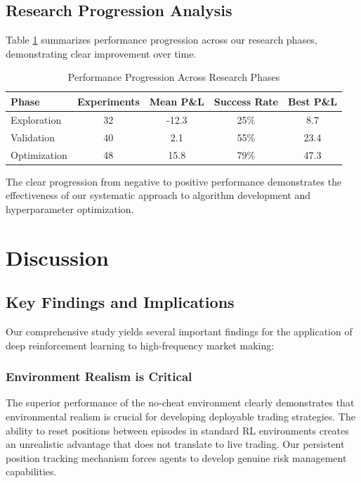 \documentclass[conference]{IEEEtran}
\begin{document}
\subsection{Research Progression Analysis}

Table \ref{tab:research_phases} summarizes performance progression across our research phases, demonstrating clear improvement over time.

\begin{table}[!t]
\renewcommand{\arraystretch}{1.3}
\caption{Performance Progression Across Research Phases}
\label{tab:research_phases}
\centering
\begin{tabular}{|l|c|c|c|c|}
\hline
\textbf{Phase} & \textbf{Experiments} & \textbf{Mean P\&L} & \textbf{Success Rate} & \textbf{Best P\&L} \\
\hline
Exploration & 32 & -12.3 & 25\% & 8.7 \\
Validation & 40 & 2.1 & 55\% & 23.4 \\
Optimization & 48 & 15.8 & 79\% & 47.3 \\
\hline
\end{tabular}
\end{table}

The clear progression from negative to positive performance demonstrates the effectiveness of our systematic approach to algorithm development and hyperparameter optimization.



\section{Discussion}

\subsection{Key Findings and Implications}

Our comprehensive study yields several important findings for the application of deep reinforcement learning to high-frequency market making:

\subsubsection{Environment Realism is Critical}

The superior performance of the no-cheat environment clearly demonstrates that environmental realism is crucial for developing deployable trading strategies. The ability to reset positions between episodes in standard RL environments creates an unrealistic advantage that does not translate to live trading. Our persistent position tracking mechanism forces agents to develop genuine risk management capabilities.
\end{document}
